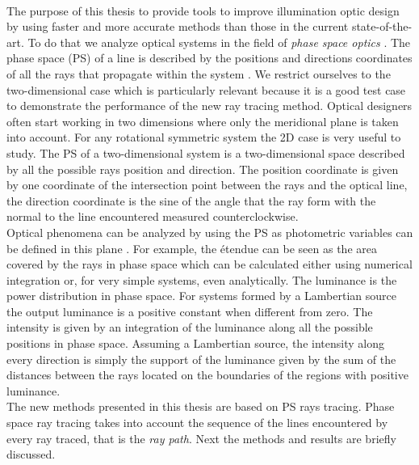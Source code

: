 \\ \indent The purpose of this thesis to provide tools to improve illumination optic design by using faster and more accurate methods than those in the current state-of-the-art.
To do that we analyze optical systems in the field of \textit{phase space optics} \cite{torre2005linear}.
The phase space (PS) of a line is described by the positions and directions coordinates of all the rays that propagate within the system \cite{testorf2009phase}. We restrict ourselves to the two-dimensional case which is particularly relevant because it is a good test case to
demonstrate the performance of the new ray tracing method.
Optical designers often start working in two dimensions where only the
meridional plane is taken into account. For any rotational symmetric
system the 2D case is very useful to study. 
The PS of a two-dimensional system is a two-dimensional space described by all the possible rays position and direction. The position coordinate is given by one coordinate of the intersection point between the rays and the optical line, the direction coordinate is the sine of the angle that the ray form with the normal to the line encountered measured counterclockwise. 
\\ \indent Optical phenomena can be analyzed by using the PS as photometric variables can be defined in this plane \cite{rausch2014illumination}.  
For example, the \'{e}tendue can be seen as the area covered by the rays in phase space which can be calculated either using numerical integration or, for very simple systems, even analytically. The luminance is the power distribution in phase space. For systems formed by a Lambertian source the output luminance is a positive constant when different from zero. The intensity is given by an integration of the luminance along all the possible positions in phase space. Assuming a Lambertian source, the intensity along every direction is simply the support of the luminance given by the sum of the distances between the rays located on the boundaries of the regions with positive luminance. 
\\ \indent The new methods presented in this thesis are based on PS rays tracing.
Phase space ray tracing takes into account the sequence of the lines encountered by every ray traced, that is the \textit{ray path}.
Next the methods and results are briefly discussed. 
